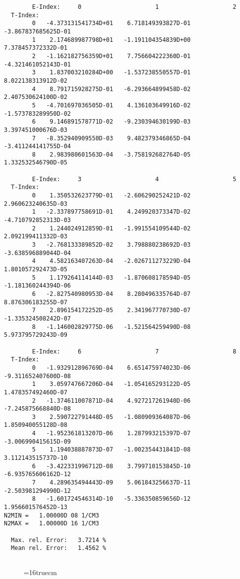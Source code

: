 \documentclass[12pt,dvipdfmx]{article}
\begin{document}
\begin{small}\begin{verbatim}
        E-Index:     0                     1                     2
  T-Index:
        0   -4.373131541734D+01    6.718149393827D-01   -3.867837685625D-01
        1    2.174689987798D+01   -1.191104354839D+00    7.378457372332D-01
        2   -1.162182756359D+01    7.756604222360D-01   -4.321461052143D-01
        3    1.837003210284D+00   -1.537238550557D-01    8.022138313912D-02
        4    8.791715928275D-01   -6.293664899458D-02    2.407530624100D-02
        5   -4.701697036505D-01    4.136103649916D-02   -1.573783289950D-02
        6    9.146891578771D-02   -9.230394630199D-03    3.397451000676D-03
        7   -8.352940909550D-03    9.482379346865D-04   -3.411244141755D-04
        8    2.983980601563D-04   -3.758192682764D-05    1.332532546790D-05

        E-Index:     3                     4                     5
  T-Index:
        0    1.350532623779D-01   -2.606290252421D-02    2.960623240635D-03
        1   -2.337897758691D-01    4.249920373347D-02   -4.710792852313D-03
        2    1.244024912859D-01   -1.991554109544D-02    2.092199411332D-03
        3   -2.768133389852D-02    3.798880238692D-03   -3.638596889044D-04
        4    4.582163407263D-04   -2.026711273229D-04    1.801057292473D-05
        5    1.179264114144D-03   -1.870608178594D-05   -1.181360244394D-06
        6   -2.827540980953D-04    8.280496335764D-07    8.876306183255D-07
        7    2.896154172252D-05    2.341967770730D-07   -1.335324508242D-07
        8   -1.146002829775D-06   -1.521564259490D-08    5.973795729243D-09

        E-Index:     6                     7                     8
  T-Index:
        0   -1.932912896769D-04    6.651475974023D-06   -9.311652407600D-08
        1    3.059747667206D-04   -1.054165293122D-05    1.478357492460D-07
        2   -1.374611007871D-04    4.927217261940D-06   -7.245875668840D-08
        3    2.590722791448D-05   -1.080909364087D-06    1.850940055128D-08
        4   -1.952361813207D-06    1.287993215397D-07   -3.006990415615D-09
        5    1.194038887873D-07   -1.002354431841D-08    3.112143515737D-10
        6   -3.422331996712D-08    3.799710153845D-10   -6.935765606162D-12
        7    4.289635494443D-09    5.061843256637D-11   -2.503981294990D-12
        8   -1.601724546314D-10   -5.336350859656D-12    1.956601576452D-13
N2MIN =   1.00000D 08 1/CM3
N2MAX =   1.00000D 16 1/CM3

  Max. rel. Error:   3.7214 %
  Mean rel. Error:   1.4562 %


\end{verbatim}\end{small}
\begin{figure} \label{2.2.5mai}
\epsfxsize=16truecm
\end{figure}
\newpage
\end{document}

